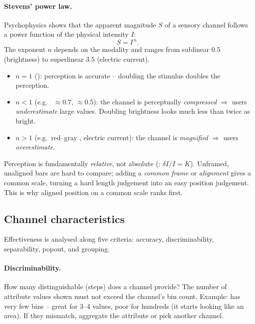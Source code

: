 \paragraph{Stevens' power law.} Psychophysics shows that the apparent magnitude
$S$ of a sensory channel follows a power function of the physical intensity $I$:
\[
  S = I^{\,n}.
\]
The exponent $n$ depends on the modality and ranges from sublinear $0.5$
(brightness) to superlinear $3.5$ (electric current).
\begin{itemize}
  \item $n = 1$ (): perception is accurate -- doubling the stimulus
        doubles the perception.
  \item $n < 1$  (e.g.\  $\approx 0.7$,
         $\approx 0.5$): the channel is perceptually
        \emph{compressed} $\Rightarrow$ users \emph{underestimate} large values.
        Doubling brightness looks much less than twice as bright.
  \item $n > 1$  (e.g.\ red--gray , electric
        current): the channel is \emph{magnified} $\Rightarrow$ users
        \emph{overestimate}.
\end{itemize}

\begin{keybox}
Perception is fundamentally \emph{relative}, not absolute (:
$\delta I / I = K$). Unframed, unaligned bars are hard to compare; adding a
\emph{common frame} or \emph{alignment} gives a common scale, turning a hard
length judgement into an easy position judgement. This is why aligned position
on a common scale ranks first.
\end{keybox}

\subsection{Channel characteristics}

Effectiveness is analysed along five criteria: accuracy, discriminability,
separability, popout, and grouping.

\paragraph{Discriminability.} How many distinguishable  (steps) does
a channel provide? The number of attribute values shown must not exceed the
channel's bin count. Example:  has very few bins -- great for
3--4 values, poor for hundreds (it starts looking like an area). If they
mismatch, aggregate the attribute or pick another channel.

